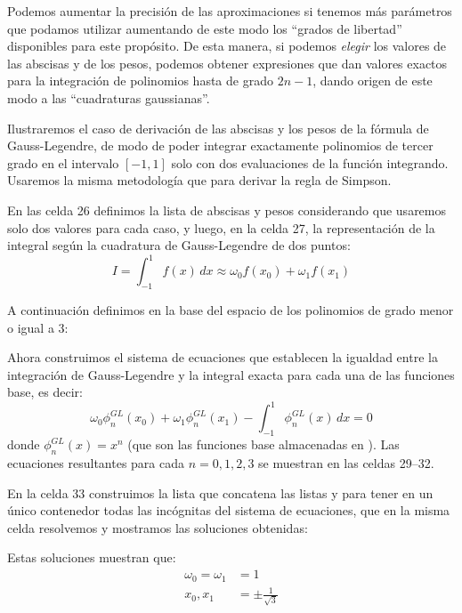 Podemos aumentar la precisión de las aproximaciones si tenemos más parámetros que podamos utilizar aumentando de este modo los ``grados de libertad'' disponibles para este propósito. De esta manera, si podemos \textit{elegir} los valores de las abscisas y de los pesos, podemos obtener expresiones que dan valores exactos para la integración de polinomios hasta de grado $2n-1$, dando origen de este modo a las ``cuadraturas gaussianas''.

Ilustraremos el caso de derivación de las abscisas y los pesos de la fórmula de Gauss-Legendre, de modo de poder integrar exactamente polinomios de tercer grado en el intervalo $[-1, 1]$ solo con dos evaluaciones de la función integrando. Usaremos la misma metodología que para derivar la regla de Simpson.


En las celda 26 definimos la lista de abscisas y pesos considerando que usaremos solo dos valores para cada caso, y luego, en la celda 27, la representación de la integral según la cuadratura de Gauss-Legendre de dos puntos:
\begin{equation}\label{eq:intGL}
 I = \int_{-1}^{1} f(x) \, dx \approx \omega_0 f(x_0) + \omega_1 f(x_1)
\end{equation} 

A continuación definimos en  la base del espacio de los polinomios de grado menor o igual a 3:


Ahora construimos el sistema de ecuaciones que establecen la igualdad entre la integración de Gauss-Legendre y la integral exacta para cada una de las funciones base, es decir:
\[ \omega_0 \phi_n^{GL}(x_0) + \omega_1 \phi_n^{GL}(x_1) - \int_{-1}^{1} \phi_n^{GL}(x) \, dx = 0 \]
donde $\phi_n^{GL}(x) = x^n$ (que son las funciones base almacenadas en ). Las ecuaciones resultantes para cada $n = 0, 1, 2, 3$ se muestran en las celdas 29--32.

En la celda 33 construimos la lista  que concatena las listas  y  para tener en un único contenedor todas las incógnitas del sistema de ecuaciones, que en la misma celda resolvemos y mostramos las soluciones obtenidas:

Estas soluciones muestran que:
\begin{align*}
 \omega_0 = \omega_1 &= 1 \\
  x_0, x_1 &= \pm \frac{1}{\sqrt{3}}
\end{align*}

